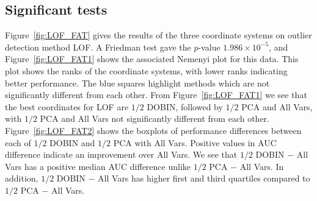 \documentclass[letter,12pt]{article}
\begin{document}
\subsection{Significant tests}\label{sec:DatRepo1}


Figure~\ref{fig:LOF_FAT} gives the results of the three coordinate systems on outlier detection method LOF. A Friedman test gave the $p$-value $1.986 \times 10^{-5}$, and Figure~\ref{fig:LOF_FAT1} shows the associated Nemenyi plot for this data. This plot shows the ranks of the coordinate systems, with lower ranks indicating better performance. The blue squares highlight methods which are not significantly different from each other. From Figure~\ref{fig:LOF_FAT1} we see that the best coordinates for LOF are $1/2$ DOBIN, followed by $1/2$ PCA and All Vars, with $1/2$ PCA and All Vars not significantly different from each other.
Figure~\ref{fig:LOF_FAT2} shows the boxplots of performance differences between each of $1/2$ DOBIN and $1/2$ PCA with All Vars. %
Positive values in AUC difference indicate an improvement over All Vars. We see that $1/2$ DOBIN $-$ All Vars has a positive median AUC difference unlike $1/2$ PCA $-$ All Vars. In addition, $1/2$ DOBIN $-$ All Vars has higher first and third quartiles compared to  $1/2$ PCA $-$ All Vars.
\end{document}
